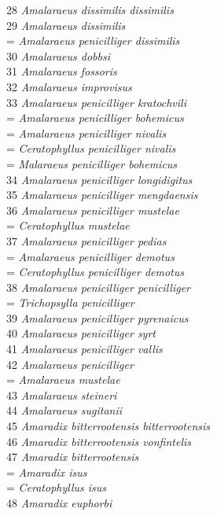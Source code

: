 \documentclass[
]{article}
\begin{document}
28 \emph{Amalaraeus dissimilis dissimilis}\\
29 \emph{Amalaraeus dissimilis}\\
= \emph{Amalaraeus penicilliger dissimilis}\\
30 \emph{Amalaraeus dobbsi}\\
31 \emph{Amalaraeus fossoris}\\
32 \emph{Amalaraeus improvisus}\\
33 \emph{Amalaraeus penicilliger kratochvili}\\
= \emph{Amalaraeus penicilliger bohemicus}\\
= \emph{Amalaraeus penicilliger nivalis}\\
= \emph{Ceratophyllus penicilliger nivalis}\\
= \emph{Malaraeus penicilliger bohemicus}\\
34 \emph{Amalaraeus penicilliger longidigitus}\\
35 \emph{Amalaraeus penicilliger mengdaensis}\\
36 \emph{Amalaraeus penicilliger mustelae}\\
= \emph{Ceratophyllus mustelae}\\
37 \emph{Amalaraeus penicilliger pedias}\\
= \emph{Amalaraeus penicilliger demotus}\\
= \emph{Ceratophyllus penicilliger demotus}\\
38 \emph{Amalaraeus penicilliger penicilliger}\\
= \emph{Trichopsylla penicilliger}\\
39 \emph{Amalaraeus penicilliger pyrenaicus}\\
40 \emph{Amalaraeus penicilliger syrt}\\
41 \emph{Amalaraeus penicilliger vallis}\\
42 \emph{Amalaraeus penicilliger}\\
= \emph{Amalaraeus mustelae}\\
43 \emph{Amalaraeus steineri}\\
44 \emph{Amalaraeus sugitanii}\\
45 \emph{Amaradix bitterrootensis bitterrootensis}\\
46 \emph{Amaradix bitterrootensis vonfintelis}\\
47 \emph{Amaradix bitterrootensis}\\
= \emph{Amaradix isus}\\
= \emph{Ceratophyllus isus}\\
48 \emph{Amaradix euphorbi}\\
\end{document}
